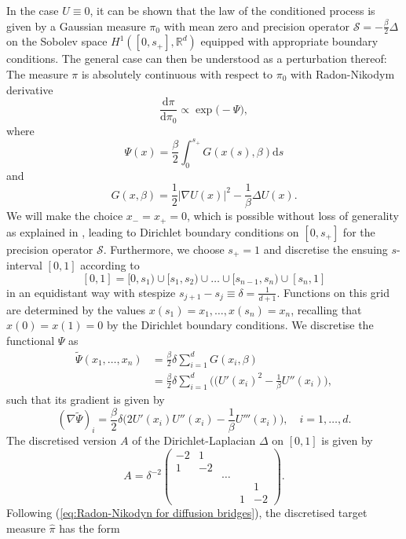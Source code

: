 In the case $U\equiv0$, it can be shown that the law of the conditioned
process is given by a Gaussian measure $\pi_{0}$ with mean zero and
precision operator $\mathcal{S}=-\frac{\beta}{2}\Delta$ on the Sobolev
space $H^{1}([0,s_{+}],\mathbb{R}^{d})$ equipped with appropriate
boundary conditions. The general case can then be understood as a
perturbation thereof: The measure $\pi$ is absolutely continuous
with respect to $\pi_{0}$ with Radon-Nikodym derivative 
\begin{equation}
\frac{\mathrm{d}\pi}{\mathrm{d}\pi_{0}}\propto\exp\big(-\Psi\big),\label{eq:Radon-Nikodyn for diffusion bridges}
\end{equation}
where
\[
\Psi(x)=\frac{\beta}{2}\int_{0}^{s_{+}}G(x(s),\beta)\mathrm{d}s
\]
and 
\[
G(x,\beta)=\frac{1}{2}\vert\nabla U(x)\vert^{2}-\frac{1}{\beta}\Delta U(x).
\]
We will make the choice $x_{-}=x_{+}=0$, which is possible without
loss of generality as explained in \cite[Remark 3.1]{BeskosRobertsStuartEtAl2008}, leading to Dirichlet boundary conditions on $[0,s_+]$ for the precision operator $\mathcal{S}$. Furthermore, we choose $s_{+}=1$ and discretise the ensuing
$s$-interval $[0,1]$ according to 
\[
[0,1]=[0,s_{1})\cup[s_{1},s_{2})\cup\ldots\cup[s_{n-1},s_{n})\cup[s_{n},1]
\]
in an equidistant way with stespize $s_{j+1}-s_{j}\equiv\delta=\frac{1}{d+1}$. Functions on this grid are determined by the values $x(s_1)=x_1,\ldots,x(s_n)=x_n$, recalling that $x(0)=x(1)=0$ by the Dirichlet boundary conditions. We discretise the functional
$\Psi$ as
\begin{align*}
\tilde{\Psi}(x_{1},\ldots,x_{n}) & =\frac{\beta}{2}\delta\sum_{i=1}^{d}G(x_{i},\beta)\\
& =\frac{\beta}{2}\delta \sum_{i=1}^{d}\big((U'(x_{i})^{2}-\frac{1}{\beta}U''(x_{i})\big),
\end{align*}
such that its gradient is given by 
\[
(\nabla\tilde{\Psi})_{i}=\frac{\beta}{2}\delta\big(2U'(x_{i})U''(x_{i})-\frac{1}{\beta}U'''(x_{i})\big),\quad i=1,\ldots,d.
\]
The discretised version $A$ of the Dirichlet-Laplacian $\Delta$ on $[0,1]$ is given by
\[
A=\delta^{-2}\left(\begin{array}{ccccc}
-2 & 1\\
1 & -2\\
&  & \ldots\\
&  &  &  & 1\\
&  &  & 1 & -2
\end{array}\right).
\]
Following (\ref{eq:Radon-Nikodyn for diffusion bridges}), the discretised
target measure $\widehat{\pi}$ has the form

